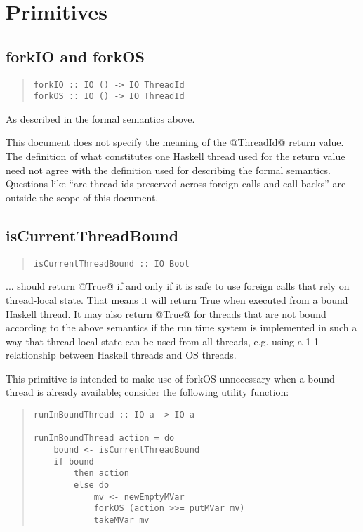 \documentclass[a4paper,twoside]{article}
\begin{document}
\section{Primitives}

\subsection{forkIO and forkOS}

\begin{quote}
\begin{verbatim}
forkIO :: IO () -> IO ThreadId
forkOS :: IO () -> IO ThreadId
\end{verbatim}
\end{quote}

As described in the formal semantics above.

This document does not specify the meaning of the @ThreadId@ return value. The
definition of what constitutes one Haskell thread used for the return value
need not agree with the definition used for describing the formal semantics.
Questions like ``are thread ids preserved across foreign calls and call-backs''
are outside the scope of this document.

\subsection{isCurrentThreadBound}

\begin{quote}
\begin{verbatim}
isCurrentThreadBound :: IO Bool
\end{verbatim}
\end{quote}

... should return @True@ if and only if it is safe to use foreign calls that
rely on thread-local state. That means it will return True when executed from a
bound Haskell thread. It may also return @True@ for threads that are not bound
according to the above semantics if the run time system is implemented in such
a way that thread-local-state can be used from all threads, e.g. using a 1-1
relationship between Haskell threads and OS threads.

This primitive is intended to make use of forkOS unnecessary when a bound
thread is already available; consider the following utility function:

\begin{quote}
\begin{verbatim}
runInBoundThread :: IO a -> IO a

runInBoundThread action = do
    bound <- isCurrentThreadBound
    if bound
        then action
        else do
            mv <- newEmptyMVar
            forkOS (action >>= putMVar mv)
            takeMVar mv
\end{verbatim}
\end{quote}
\end{document}
